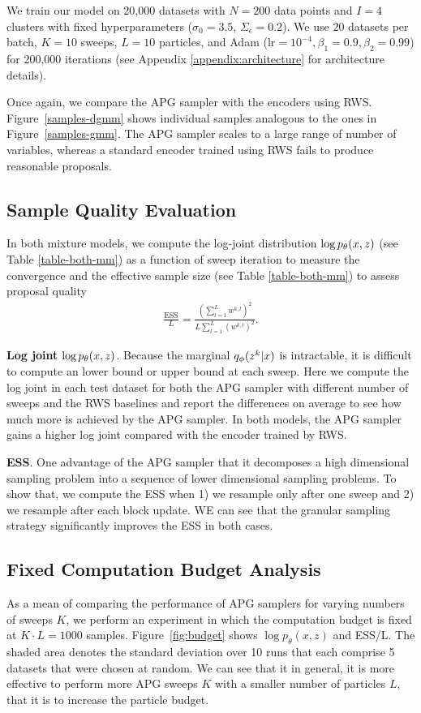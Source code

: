 \documentclass[anonymous=false, %
               format=acmsmall, %
               review=true, %
               screen=true, %
               nonacm=true]{acmart}
\theoremstyle{definition}
\begin{document}
We train our model on 20,000 datasets with $N = 200$ data points and $I = 4$ clusters with fixed hyperparameters ($\sigma_0 = 3.5$, $\Sigma_{\epsilon} = 0.2$). We use $20$ datasets per batch, $K=10$ sweeps, $L=10$ particles, and Adam ($\mathrm{lr} = 10^{-4}, \beta_1 = 0.9, \beta_2 = 0.99$) for 200,000 iterations (see Appendix \ref{appendix:architecture} for architecture details).

Once again, we compare the APG sampler with the encoders using RWS. Figure~\ref{samples-dgmm} shows individual samples analogous to the ones in Figure~\ref{samples-gmm}. The APG sampler scales to a large range of number of variables, whereas a standard encoder trained using RWS fails to produce reasonable proposals.

\subsection{Sample Quality Evaluation}
In both mixture models, we compute the log-joint distribution $\log p_\theta(x, z)$ (see Table \ref{table-both-mm}) as a function of sweep iteration to measure the convergence and the effective sample size (see Table \ref{table-both-mm}) to assess proposal quality
\begin{align}
\label{ess-eq}
    \frac{\text{ESS}}{L} 
    = 
    \frac{(\sum_{l=1}^L w^{k,l})^2}
         {L \sum_{l=1}^L (w^{k,l})^2}
    .
\end{align}


\textbf{Log joint} $\log p_\theta(x, z)$. Because the marginal $q_\phi(z^k | x)$ is intractable, it is difficult to compute an lower bound or upper bound at each sweep. Here we compute the log joint in each test dataset for both the APG sampler with different number of sweeps and the RWS baselines and report the differences on average to see how much more is achieved by the APG sampler. In both models, the APG sampler gains a higher log joint compared with the encoder trained by RWS.

\textbf{ESS}. One advantage of the APG sampler that it decomposes a high dimensional sampling problem into a sequence of lower dimensional sampling problems. To show that, we compute the ESS when 1) we resample only after one sweep and 2) we resample after each block update. WE can see that the granular sampling strategy significantly improves the ESS in both cases.

\subsection{Fixed Computation Budget Analysis}
As a mean of comparing the performance of APG samplers for varying numbers of sweeps $K$, we perform an experiment in which the computation budget is fixed at $K \cdot L = 1000$ samples. Figure~\ref{fig:budget} shows $\log p_\theta(x, z)$ and ESS/L. The shaded area denotes the standard deviation over 10 runs that each comprise 5 datasets that were chosen at random. We can see that it in general, it is more effective to perform more APG sweeps $K$ with a smaller number of particles $L$, that it is to increase the particle budget. 
\end{document}
